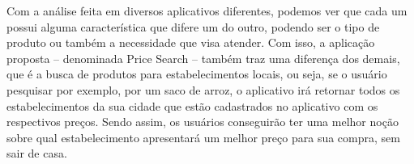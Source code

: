 Com a análise feita em diversos aplicativos diferentes, podemos ver que cada um possui alguma característica que difere um do outro, podendo ser o tipo de produto ou também a necessidade que visa atender. Com isso, a aplicação proposta -- denominada Price Search -- também traz uma diferença dos demais, que é a busca de produtos para estabelecimentos locais, ou seja, se o usuário pesquisar por exemplo, por um saco de arroz, o aplicativo irá retornar todos os estabelecimentos da sua cidade que estão cadastrados no aplicativo com os respectivos preços. Sendo assim, os usuários conseguirão ter uma melhor noção sobre qual estabelecimento apresentará um melhor preço para sua compra, sem sair de casa.
